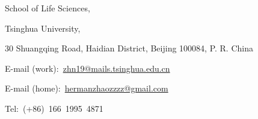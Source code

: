 School of Life Sciences, 

Tsinghua University,

30 Shuangqing Road, Haidian District, Beijing 100084, P. R. China

E-mail (work):~\href{mailto:zhn19@mails.tsinghua.edu.cn}{zhn19@mails.tsinghua.edu.cn}

E-mail (home):~\href{mailto:hermanzhaozzzz@gmail.com}{hermanzhaozzzz@gmail.com}

Tel:~(+86)~166~1995~4871